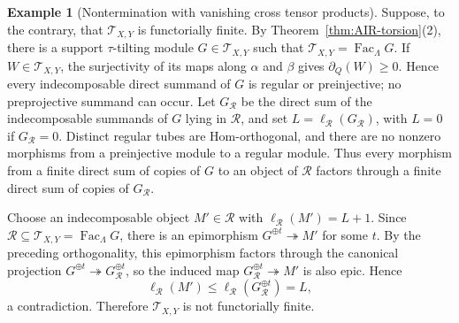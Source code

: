\documentclass[11pt,reqno]{amsart}
\theoremstyle{definition}
\newtheorem{example}[theorem]{Example}
\theoremstyle{remark}
\newcommand{\Fac}{\operatorname{Fac}}
\numberwithin{equation}{section}
\begin{document}
\begin{example}[Nontermination with vanishing cross tensor products]
Suppose, to the contrary, that $\mathcal T_{X,Y}$ is functorially finite.
By Theorem~\ref{thm:AIR-torsion}\textup{(2)}, there is a support
$\tau$-tilting module $G\in\mathcal T_{X,Y}$ such that
$\mathcal T_{X,Y}=\Fac_\Lambda G$.
If $W\in\mathcal T_{X,Y}$, the surjectivity of its maps along $\alpha$ and
$\beta$ gives $\partial_Q(W)\geq0$.  Hence every indecomposable direct
summand of $G$ is regular or preinjective; no preprojective summand can
occur.  Let $G_{\mathcal R}$ be the direct sum of the indecomposable
summands of $G$ lying in $\mathcal R$, and set
$L=\ell_{\mathcal R}(G_{\mathcal R})$, with $L=0$ if
$G_{\mathcal R}=0$.  Distinct regular tubes are
Hom-orthogonal, and there are no nonzero morphisms from a preinjective module
to a regular module.  Thus every morphism from a finite direct sum of copies
of $G$ to an object of $\mathcal R$ factors through a finite direct sum of
copies of $G_{\mathcal R}$.

Choose an indecomposable object $M'\in\mathcal R$ with
$\ell_{\mathcal R}(M')=L+1$.  Since
$\mathcal R\subseteq\mathcal T_{X,Y}=\Fac_\Lambda G$, there is an
epimorphism $G^{\oplus t}\twoheadrightarrow M'$ for some $t$.  By the
preceding orthogonality, this epimorphism factors through the canonical
projection $G^{\oplus t}\twoheadrightarrow G_{\mathcal R}^{\oplus t}$, so the
induced map $G_{\mathcal R}^{\oplus t}\twoheadrightarrow M'$ is also epic.
Hence
\[
 \ell_{\mathcal R}(M')
 \leq \ell_{\mathcal R}(G_{\mathcal R}^{\oplus t})
 =L,
\]
a contradiction.  Therefore $\mathcal T_{X,Y}$ is not functorially finite.


\end{example}
\end{document}
